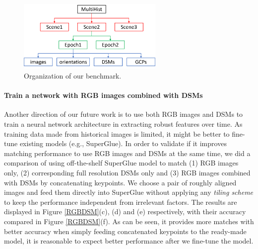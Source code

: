 \begin{figure}[htbp]
	\begin{center}
			\begin{minipage}[t]{1\linewidth}
				\centering
				\includegraphics[width=7cm]{images/Chapitre5/MultiHist.png}
			\end{minipage}%
		\caption{Organization of our benchmark.}
		\label{multihist}
	\end{center}
\end{figure}


\paragraph{Train a network with RGB images combined with \ac{DSM}s}
Another direction of our future work is to use both RGB images and \ac{DSM}s to train a neural network architecture in extracting robust features over time. 
As training data made from historical images is limited, it might be better to fine-tune existing models (e.g., SuperGlue). 
In order to validate if it improves matching performance to use RGB images and \ac{DSM}s at the same time, we did a comparison of using off-the-shelf SuperGlue model to match (1) RGB images only, (2) corresponding full resolution \ac{DSM}s only and (3) RGB images combined with \ac{DSM}s by concatenating keypoints. We choose a pair of roughly aligned images and feed them directly into SuperGlue without applying any \textit{tiling scheme} to keep the performance independent from irrelevant factors. The results are displayed in Figure \ref{RGBDSM}(c), (d) and (e) respectively, with their accuracy compared in Figure \ref{RGBDSM}(f). 
As can be seen, it provides more matches with better accuracy when simply feeding concatenated keypoints to the ready-made model, it is reasonable to expect better performance after we fine-tune the model. 


